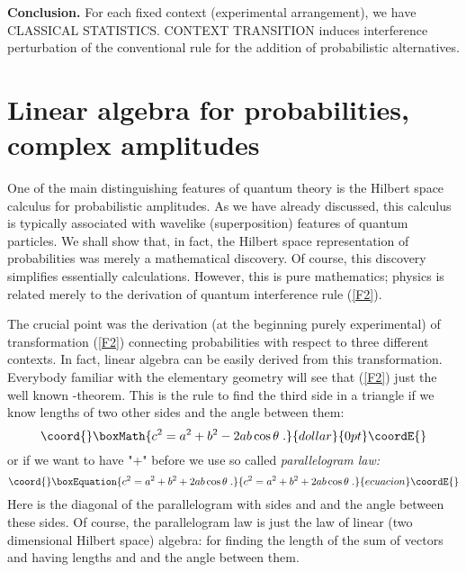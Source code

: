 \documentclass[12pt,oneside,final,a4paper]{article}
\begin{document}
{\bf Conclusion.} For each fixed context (experimental arrangement), we have CLASSICAL STATISTICS.
CONTEXT TRANSITION induces interference perturbation
of the conventional rule for the addition of probabilistic alternatives.


\section{Linear algebra for probabilities, complex amplitudes}

One of the main distinguishing features of quantum theory
is the Hilbert space calculus for probabilistic amplitudes.
As we have already discussed, this calculus is typically associated
with wavelike (superposition) features of quantum particles.
We shall show that, in fact, the Hilbert space representation of
probabilities was merely a mathematical discovery. Of course, this discovery
simplifies essentially calculations. However, this is pure mathematics;
physics is related merely to the derivation of
quantum interference rule (\ref{F2}). 

The crucial point was 
the derivation (at the beginning purely experimental) of transformation (\ref{F2})
connecting probabilities with respect to three different contexts. In fact, linear algebra
can be easily derived from this transformation. Everybody familiar with the elementary geometry
will see that (\ref{F2}) just the well known \myHighlight{$\cos$}\coordHE{}-theorem. This is the rule to find
the third side in a triangle  if we know
lengths of two other sides and the angle \myHighlight{$\theta$}\coordHE{} between them:
$$\coord{}\boxMath{
c^2 =a^2 + b^2 - 2 ab \cos \theta\;.
}{dollar}{0pt}\coordE{}$$
or if we want to have "+" before \myHighlight{$\cos$}\coordHE{} we use so called {\it parallelogram law:}
\begin{equation}\coord{}\boxEquation{
\label{P}
c^2 = a^2 + b^2 + 2 ab \cos \theta\;.
}{
c^2 = a^2 + b^2 + 2 ab \cos \theta\;.
}{ecuacion}\coordE{}\end{equation}
Here \coordHE{} is the diagonal of the parallelogram with sides \coordHE{} and \coordHE{} and the angle \myHighlight{$\theta$}\coordHE{}
between these sides. Of course, the parallelogram law is  just the law of linear
(two dimensional Hilbert space) algebra: for finding the length \coordHE{} of the sum \coordHE{}
of vectors \coordHE{} and \coordHE{} having lengths \coordHE{} and \coordHE{} and the angle \myHighlight{$\theta$}\coordHE{} between them.
\end{document}
